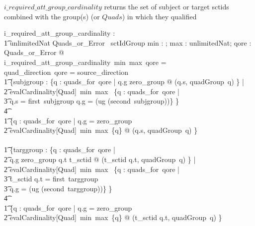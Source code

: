 \documentclass{article}
\begin{document}
\noindent
$i\_required\_att\_group\_cardinality$ returns the set of subject or target sctids combined with the group(s) (or $Quads$) in which they qualified
\begin{axdef}
   i\_required\_att\_group\_cardinality : \\
\t1 \nat \fun unlimitedNat \fun Quads\_or\_Error \ \fun \power sctIdGroup
\where
   \forall min : \nat; max : unlimitedNat; qore : Quads\_or\_Error  @ \\
i\_required\_att\_group\_cardinality~min~max~qore = \\
\IF quad\_direction~qore = source\_direction \THEN \\
\t1 \{subjgroup :  \{q : quads\_for~qore | q.g \neq zero\_group @ (q.s, quadGroup~q) \} | \\
\t2 evalCardinality[Quad]~min~max~ \{q : quads\_for~qore | \\
\t3 q.s = first~subjgroup \land q.g = (ug \inv (second~subjgroup))\} \neq \emptyset \}  \\
\t4 \cup \\
\t1 \{q : quads\_for~qore | q.g = zero\_group \land  \\
\t2 evalCardinality[Quad]~min~max~\{q\} \neq \emptyset @ (q.s, quadGroup~q) \} \\
\also
\ELSE \\
\t1 \{targgroup :  \{q : quads\_for~qore | \\
\t2 q.g \neq zero\_group \land q.t \in \ran t\_sctid @ (t\_sctid \inv q.t, quadGroup~q) \} | \\
\t2 evalCardinality[Quad]~min~max~ \{q : quads\_for~qore | \\
\t3 t\_sctid \inv q.t = first~targgroup \land \\
\t3 q.g = (ug \inv (second~targgroup))\} \neq \emptyset \} \\
\t4 \cup \\
\t1 \{q : quads\_for~qore | q.g = zero\_group \land  \\
\t2 evalCardinality[Quad]~min~max~\{q\} \neq \emptyset @ (t\_sctid \inv q.t, quadGroup~q) \} \\
\end{axdef}
\end{document}
